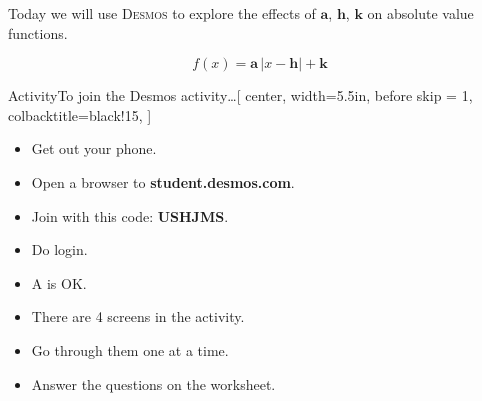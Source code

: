 \vspace{\parskip}
Today we will use {\scshape Desmos} 
to explore the effects of $\bm{a}$, $\bm{h}$, $\bm{k}$ 
on  absolute value functions. 

\begin{tcolorbox}[center,width=2.5in,valign=center,]
    \large
    \vspace{-\baselineskip}
    \[ f(x) = \bm{a}\,|x-\bm{h}|+\bm{k} \]
\end{tcolorbox}

\vfill 

\begin{myAnnotate}{{Activity}}{To join the {Desmos} activity\dots}[%
    center,
    width=5.5in,
    before skip = 1\baselineskip,
    colbacktitle=black!15,
    ]
    \begin{itemize}[nosep]
        \item Get out your phone.
        \item Open a browser to {\bfseries\ttfamily student.desmos.com}.
            \begin{center}
            \end{center}
        \item Join with this code: {\bfseries\ttfamily USHJMS}.
        \item Do  login.
        \item A  is OK.
        \item There are 4 screens in the activity. 
            \begin{center}
            \end{center}
        \item Go through them one at a time.
        \item Answer the questions on the worksheet.
    \end{itemize}
\end{myAnnotate}

\vfill{}